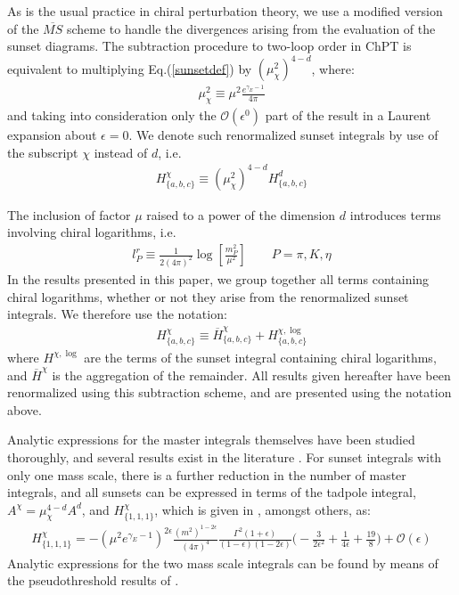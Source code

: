 \documentclass[12pt,a4paper]{article}
\begin{document}
As is the usual practice in chiral perturbation theory, we use a modified version of the $\overline{MS}$ scheme to handle the divergences arising from the evaluation of the sunset diagrams. The subtraction procedure to two-loop order in ChPT is equivalent to multiplying Eq.(\ref{sunsetdef}) by $(\mu_{\chi}^2)^{4-d}$, where:
\begin{align}
	\mu_{\chi}^2 \equiv \mu^2 \frac{e^{\gamma_E - 1}}{4\pi}
\end{align}
and taking into consideration only the $\mathcal{O}(\epsilon^0)$ part of the result in a Laurent expansion about $\epsilon = 0$. We denote such renormalized sunset integrals by use of the subscript $\chi$ instead of $d$, i.e.
\begin{align}
	H^{\chi}_{\{a,b,c\}} \equiv (\mu_{\chi}^2)^{4-d} H^d_{\{a,b,c\}}
\end{align}

The inclusion of factor $\mu$ raised to a power of the dimension $d$ introduces terms involving chiral logarithms, i.e.
\begin{align}
	l_P^r \equiv \frac{1}{2(4\pi)^2} \log \left[ \frac{m_P^2}{\mu^2} \right] \qquad P = \pi, K, \eta
	\label{chiralLog}
\end{align}
In the results presented in this paper, we group together all terms containing chiral logarithms, whether or not they arise from the renormalized sunset integrals. We therefore use the notation:
\begin{align}
	H^{\chi}_{\{a,b,c\}} \equiv \overline{H}^{\chi}_{\{a,b,c\}} + H^{\chi,\log}_{\{a,b,c\}} \label{Hnotation}
\end{align}
where $H^{\chi,\log}$ are the terms of the sunset integral containing chiral logarithms, and $\overline{H}^{\chi}$ is the aggregation of the remainder. All results given hereafter have been renormalized using this subtraction scheme, and are presented using the notation above.

Analytic expressions for the master integrals themselves have been studied thoroughly, and several results exist in the literature \cite{Berends:1997vk, Davydychev:1992mt, Gasser:1998qt, Czyz:2002re, Martin:2003qz, Adams:2015gva}. For sunset integrals with only one mass scale, there is a further reduction in the number of master integrals, and all sunsets can be expressed in terms of the tadpole integral, $A^{\chi} = \mu_{\chi}^{4-d} A^d$, and $H^{\chi}_{\{1,1,1\}}$, which is given in \cite{Berends:1997vk, Gasser:1998qt}, amongst others, as:
\begin{align}
	H^{\chi}_{\{1,1,1\}} = - \left( \mu^2 e^{\gamma_E-1} \right)^{2\epsilon} \frac{(m^2)^{1-2\epsilon}}{(4\pi)^4} \frac{\Gamma^2(1+\epsilon)}{(1-\epsilon)(1-2\epsilon)} \bigg( - \frac{3}{2\epsilon^2} + \frac{1}{4\epsilon} + \frac{19}{8} \bigg) + \mathcal{O}(\epsilon)
\end{align}
Analytic expressions for the two mass scale integrals can be found by means of the pseudothreshold results of \cite{Berends:1997vk}.
\end{document}
